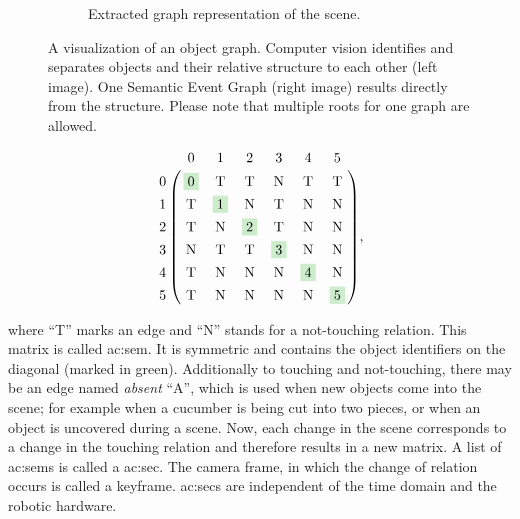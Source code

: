 \begin{figure}
\begin{subfigure}[t]{0.475\textwidth}
{    }
    \caption{Extracted graph representation of the scene.}
    \label{fig:sec_secexample_graph}
  \end{subfigure}
  \caption{A visualization of an object graph. Computer vision identifies and separates objects and their relative structure to each other (left image). One Semantic Event Graph (right image) results directly from the structure. Please note that multiple roots for one graph are allowed.}
  \label{fig:sec_secexample}
\end{figure}

\begin{align}
  \bordermatrix{
    & 0 & 1 & 2 & 3 & 4 & 5\cr
    0 & \colorbox{green120}{0} & \textup{T} & \textup{T} & \textup{N} & \textup{T} & \textup{T}\cr
    1 & \textup{T} & \colorbox{green120}{1} & \textup{N} & \textup{T} & \textup{N} & \textup{N}\cr
    2 & \textup{T} & \textup{N} & \colorbox{green120}{2} & \textup{T} & \textup{N} & \textup{N}\cr
    3 & \textup{N} & \textup{T} & \textup{T} & \colorbox{green120}{3} & \textup{N} & \textup{N}\cr
    4 & \textup{T} & \textup{N} & \textup{N} & \textup{N} & \colorbox{green120}{4} & \textup{N}\cr
    5 & \textup{T} & \textup{N} & \textup{N} & \textup{N} & \textup{N} & \colorbox{green120}{5}\cr
    },
\end{align}

where ``T'' marks an edge and ``N'' stands for a not-touching relation. 
This matrix is called \gls{ac:sem}.
It is symmetric and contains the object identifiers on the diagonal (marked in green).
Additionally to touching and not-touching, there may be an edge named \emph{absent} ``A'', which is used when new objects come into the scene; for example when a cucumber is being cut into two pieces, or when an object is uncovered during a scene.
Now, each change in the scene corresponds to a change in the touching relation and therefore results in a new matrix. 
A list of \glspl{ac:sem} is called a \acrlong{ac:sec}.
The camera frame, in which the change of relation occurs is called a keyframe.
\Glspl{ac:sec} are independent of the time domain and the robotic hardware. 

